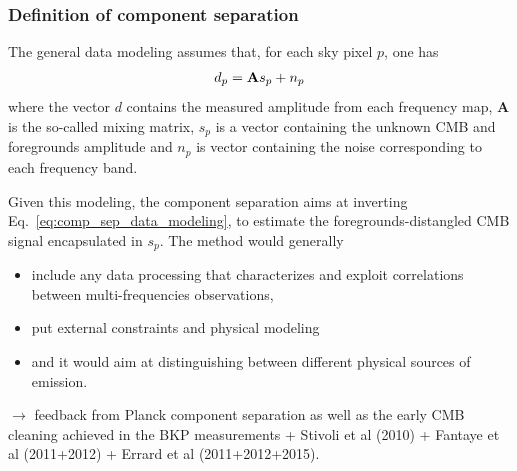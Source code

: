 \subsubsection{Definition of component separation}
The general data modeling assumes that, for each sky pixel $p$, one has
\begin{eqnarray}
	\centering	
		d_p = \mathbf{A}s_p + n_p
	\label{eq:comp_sep_data_modeling}
\end{eqnarray}
where the vector $d$ contains the measured amplitude from each frequency map, $\mathbf{A}$ is the so-called mixing matrix, $s_p$ is a vector containing the unknown CMB and foregrounds amplitude and $n_p$ is vector containing the noise corresponding to each frequency band.

Given this modeling, the component separation aims at inverting Eq.~\ref{eq:comp_sep_data_modeling}, to estimate the foregrounds-distangled CMB signal encapsulated in $s_p$. The method would generally
\begin{itemize}
	\item include any data processing that characterizes and exploit correlations between multi-frequencies observations,
	\item put external constraints and physical modeling
	\item and it would aim at distinguishing between different physical sources of emission.
\end{itemize}

$\rightarrow$ feedback from Planck component separation as well as the early CMB cleaning achieved in the BKP measurements + Stivoli et al (2010) + Fantaye et al (2011+2012) + Errard et al (2011+2012+2015).

